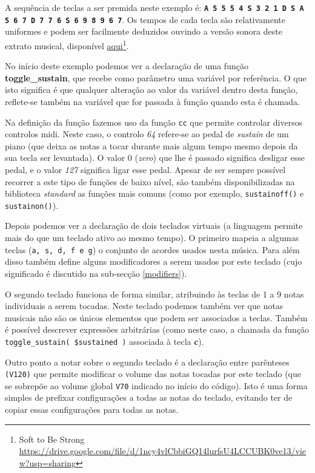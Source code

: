 A sequência de teclas a ser premida neste exemplo é: \textbf{\texttt{A 5 5 5 4 S 3 2 1 D S A 5 6 7 D 7 7 6 S 6 9 8 9 6 7}}. Os tempos de cada tecla são relativamente uniformes e podem ser facilmente deduzidos ouvindo a versão sonora deste extrato musical, disponível \href{https://drive.google.com/file/d/1ncy4vlCbbiGQ14lurfsU4LCCUBK0ve13/view?usp=sharing}{aqui}\footnote{Soft to Be Strong \url{https://drive.google.com/file/d/1ncy4vlCbbiGQ14lurfsU4LCCUBK0ve13/view?usp=sharing}}.

No início deste exemplo podemos ver a declaração de uma função \textbf{toggle\_sustain}, que recebe como parâmetro uma variável por referência. O que isto significa é que qualquer alteração ao valor da variável dentro desta função, reflete-se também na variável que for passada à função quando esta é chamada. 

Na definição da função fazemos uso da função \texttt{cc} que permite controlar diversos controlos \acrshort{midi}. Neste caso, o controlo \textit{64} refere-se ao pedal de \textit{sustain} de um piano (que deixa as notas a tocar durante mais algum tempo mesmo depois da sua tecla ser levantada). O valor 0 (\textit{zero}) que lhe é passado significa desligar esse pedal, e o valor \textit{127} significa ligar esse pedal. Apesar de ser sempre possível recorrer a este tipo de funções de baixo nível, são também disponibilizadas na biblioteca \textit{standard} as funções mais comuns (como por exemplo, \texttt{sustainoff()} e \texttt{sustainon()}).

Depois podemos ver a declaração de dois teclados virtuais (a linguagem permite mais do que um teclado ativo ao mesmo tempo). O primeiro mapeia a algumas teclas (\texttt{a, s, d, f e g}) o conjunto de acordes usados nesta música. Para além disso também define alguns modificadores a serem usados por este teclado (cujo significado é discutido na sub-secção \ref{modifiers}).

O segundo teclado funciona de forma similar, atribuindo às teclas de 1 a 9 notas individuais a serem tocadas. Neste teclado podemos também ver que notas musicais não são os únicos elementos que podem ser associados a teclas. Também é possível descrever expressões arbitrárias (como neste caso, a chamada da função \texttt{toggle\_sustain( \$sustained )} associada à tecla \textbf{c}).

Outro ponto a notar sobre o segundo teclado é a declaração entre parênteses \texttt{(V120)} que permite modificar o volume das notas tocadas por este teclado (que se sobrepõe ao volume global \texttt{V70} indicado no início do código). Isto é uma forma simples de prefixar configurações a todas as notas do teclado, evitando ter de copiar essas configurações para todas as notas.

